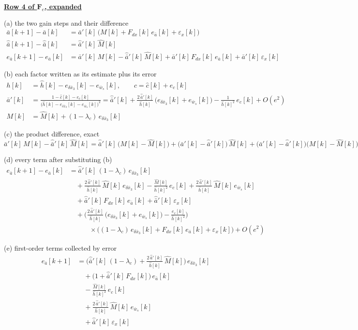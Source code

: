 \documentclass[11pt,a4paper]{ctexart}
\newcommand{\lc}{\lambda_c}
\newcommand{\bx}{\bar{x}}
\newcommand{\ba}{\bar{a}}
\newcommand{\bw}{\bar{w}}
\newcommand{\hh}{\hat{h}}
\newcommand{\ch}{\hat{c}}
\newcommand{\hd}[1]{\par\bigskip\noindent\underline{\textbf{#1}}}
\begin{document}
\clearpage
\hd{Row 4 of $\mathbf{F}_e$, expanded}

\noindent (a) the two gain steps and their difference
\[
\begin{aligned}
\ba[k+1] - \ba[k] &= \ba'[k]\,\big(M[k] + F_{dx}[k]\,e_{\ba}[k] + \varepsilon_x[k]\big) \\
\hat{\ba}[k+1] - \hat{\ba}[k] &= \hat{\ba}'[k]\,\hat{M}[k] \\
e_{\ba}[k+1] - e_{\ba}[k] &= \ba'[k]\,M[k] - \hat{\ba}'[k]\,\hat{M}[k] + \ba'[k]\,F_{dx}[k]\,e_{\ba}[k] + \ba'[k]\,\varepsilon_x[k]
\end{aligned}
\]

\noindent (b) each factor written as its estimate plus its error
\[
\begin{aligned}
h[k] &= \hh[k] - e_{\delta\bx_3}[k] - e_{\bw_s}[k], \qquad c = \ch[k] + e_c[k] \\
\ba'[k] &= \frac{1 - \ch[k] - e_c[k]}{\big(\hh[k] - e_{\delta\bx_3}[k] - e_{\bw_s}[k]\big)^{2}}
= \hat{\ba}'[k] + \frac{2\,\hat{\ba}'[k]}{\hh[k]}\,\big(e_{\delta\bx_3}[k] + e_{\bw_s}[k]\big) - \frac{1}{\hh[k]^{2}}\,e_c[k] + O(e^{2}) \\
M[k] &= \hat{M}[k] + (1-\lc)\,e_{\delta\bx_3}[k]
\end{aligned}
\]

\noindent (c) the product difference, exact
\[
\ba'[k]\,M[k] - \hat{\ba}'[k]\,\hat{M}[k]
= \hat{\ba}'[k]\,\big(M[k] - \hat{M}[k]\big) + \big(\ba'[k] - \hat{\ba}'[k]\big)\,\hat{M}[k] + \big(\ba'[k] - \hat{\ba}'[k]\big)\big(M[k] - \hat{M}[k]\big)
\]

\noindent (d) every term after substituting (b)
\[
\begin{aligned}
e_{\ba}[k+1] - e_{\ba}[k]
&= \hat{\ba}'[k]\,(1-\lc)\,e_{\delta\bx_3}[k] \\
&\quad + \frac{2\,\hat{\ba}'[k]}{\hh[k]}\,\hat{M}[k]\,e_{\delta\bx_3}[k] - \frac{\hat{M}[k]}{\hh[k]^{2}}\,e_c[k] + \frac{2\,\hat{\ba}'[k]}{\hh[k]}\,\hat{M}[k]\,e_{\bw_s}[k] \\
&\quad + \hat{\ba}'[k]\,F_{dx}[k]\,e_{\ba}[k] + \hat{\ba}'[k]\,\varepsilon_x[k] \\
&\quad + \Big(\frac{2\,\hat{\ba}'[k]}{\hh[k]}\,\big(e_{\delta\bx_3}[k] + e_{\bw_s}[k]\big) - \frac{e_c[k]}{\hh[k]^{2}}\Big) \\
&\qquad\quad \times\Big((1-\lc)\,e_{\delta\bx_3}[k] + F_{dx}[k]\,e_{\ba}[k] + \varepsilon_x[k]\Big) + O(e^{2})
\end{aligned}
\]

\noindent (e) first-order terms collected by error
\[
\begin{aligned}
e_{\ba}[k+1] &= \Big(\hat{\ba}'[k]\,(1-\lc) + \frac{2\,\hat{\ba}'[k]}{\hh[k]}\,\hat{M}[k]\Big)\,e_{\delta\bx_3}[k] \\
&\quad + \big(1 + \hat{\ba}'[k]\,F_{dx}[k]\big)\,e_{\ba}[k] \\
&\quad - \frac{\hat{M}[k]}{\hh[k]^{2}}\,e_c[k] \\
&\quad + \frac{2\,\hat{\ba}'[k]}{\hh[k]}\,\hat{M}[k]\,e_{\bw_s}[k] \\
&\quad + \hat{\ba}'[k]\,\varepsilon_x[k]
\end{aligned}
\]
\end{document}
